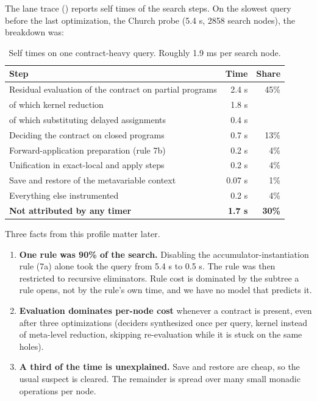 The lane trace () reports self times of the search steps. On the slowest query before the last optimization, the Church  probe (5.4 s, 2858 search nodes), the breakdown was:

\begin{table}[h]
\centering\small
\begin{tabular}{@{}L{70mm}rr@{}}
\toprule
Step & Time & Share\\
\midrule
Residual evaluation of the contract on partial programs & 2.4 s & 45\%\\
\quad of which kernel reduction & 1.8 s & \\
\quad of which substituting delayed assignments & 0.4 s & \\
Deciding the contract on closed programs & 0.7 s & 13\%\\
Forward-application preparation (rule 7b) & 0.2 s & 4\%\\
Unification in exact-local and apply steps & 0.2 s & 4\%\\
Save and restore of the metavariable context & 0.07 s & 1\%\\
Everything else instrumented & 0.2 s & 4\%\\
\textbf{Not attributed by any timer} & \textbf{1.7 s} & \textbf{30\%}\\
\bottomrule
\end{tabular}
\caption{Self times on one contract-heavy query. Roughly 1.9 ms per search node.}\label{tab:profile}
\end{table}

Three facts from this profile matter later.

\begin{enumerate}
\item \textbf{One rule was 90\% of the search.} Disabling the accumulator-instantiation rule (7a) alone took the query from 5.4 s to 0.5 s. The rule was then restricted to recursive eliminators. Rule cost is dominated by the subtree a rule opens, not by the rule's own time, and we have no model that predicts it.
\item \textbf{Evaluation dominates per-node cost} whenever a contract is present, even after three optimizations (deciders synthesized once per query, kernel instead of meta-level reduction, skipping re-evaluation while it is stuck on the same holes).
\item \textbf{A third of the time is unexplained.} Save and restore are cheap, so the usual suspect is cleared. The remainder is spread over many small monadic operations per node.
\end{enumerate}

